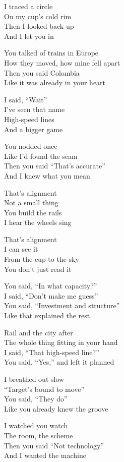 \begin{lyrics}
I traced a circle\\
On my cup’s cold rim\\
Then I looked back up\\
And I let you in

You talked of trains in Europe\\
How they moved, how mine fell apart\\
Then you said Colombia\\
Like it was already in your heart

I said, “Wait”\\
I’ve seen that name\\
High-speed lines\\
And a bigger game

You nodded once\\
Like I’d found the seam\\
Then you said “That’s accurate”\\
And I knew what you mean

That’s alignment\\
Not a small thing\\
You build the rails\\
I hear the wheels sing

That’s alignment\\
I can see it\\
From the cup to the sky\\
You don’t just read it

You said, “In what capacity?”\\
I said, “Don’t make me guess”\\
You said, “Investment and structure”\\
Like that explained the rest

Rail and the city after\\
The whole thing fitting in your hand\\
I said, “That high-speed line?”\\
You said, “Yes,” and left it planned

I breathed out slow\\
“Target’s bound to move”\\
You said, “They do”\\
Like you already knew the groove

I watched you watch\\
The room, the scheme\\
Then you said “Not technology”\\
And I wanted the machine


\end{lyrics}
